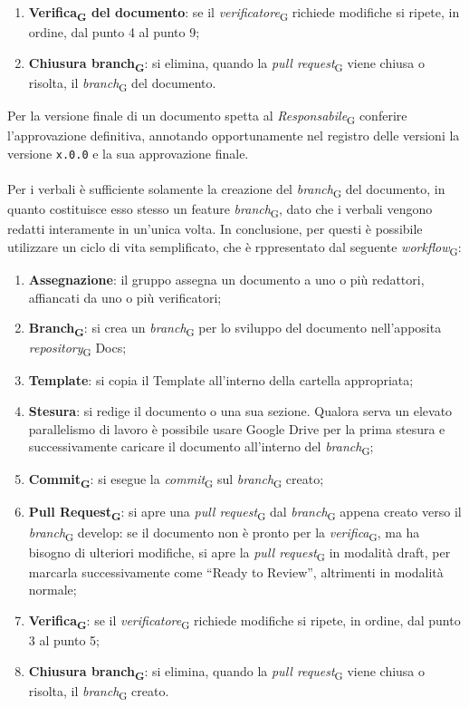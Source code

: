 \begin{enumerate}
    \item \textbf{Verifica\textsubscript{G} del documento}: se il \textit{verificatore}\textsubscript{G} richiede modifiche si ripete, in ordine, dal punto 4 al punto 9;
    \item \textbf{Chiusura branch\textsubscript{G}}: si elimina, quando la \textit{pull request}\textsubscript{G} viene chiusa o risolta, il \textit{branch}\textsubscript{G} del documento.
\end{enumerate}
Per la versione finale di un documento spetta al \textit{Responsabile}\textsubscript{G} conferire l’approvazione definitiva, annotando opportunamente nel registro delle versioni la versione \texttt{x.0.0} e la sua approvazione finale.\\ \\
Per i verbali è sufficiente solamente la creazione del \textit{branch}\textsubscript{G} del documento, in quanto costituisce esso stesso un feature \textit{branch}\textsubscript{G}, dato che i verbali vengono redatti interamente in un'unica volta. In conclusione, per questi è possibile utilizzare un ciclo di vita semplificato, che è rppresentato dal seguente \textit{workflow}\textsubscript{G}:
\begin{enumerate}
    \item \textbf{Assegnazione}: il gruppo assegna un documento a uno o più redattori, affiancati da uno o più verificatori;
    \item \textbf{Branch\textsubscript{G}}: si crea un \textit{branch}\textsubscript{G} per lo sviluppo del documento nell’apposita \textit{repository}\textsubscript{G} Docs;
    \item \textbf{Template}: si copia il Template all'interno della cartella appropriata;
    \item \textbf{Stesura}: si redige il documento o una sua sezione. Qualora serva un elevato parallelismo di lavoro è possibile usare Google Drive per la prima stesura e successivamente caricare il documento all’interno del \textit{branch}\textsubscript{G};
    \item \textbf{Commit\textsubscript{G}}: si esegue la \textit{commit}\textsubscript{G} sul \textit{branch}\textsubscript{G} creato;
    \item \textbf{Pull Request\textsubscript{G}}: si apre una \textit{pull request}\textsubscript{G} dal \textit{branch}\textsubscript{G} appena creato verso il \textit{branch}\textsubscript{G} develop: se il documento non è pronto per la \textit{verifica}\textsubscript{G}, ma ha bisogno di ulteriori modifiche, si apre la \textit{pull request}\textsubscript{G} in modalità draft, per marcarla successivamente come “Ready to Review”, altrimenti in modalità normale;
    \item \textbf{Verifica\textsubscript{G}}: se il \textit{verificatore}\textsubscript{G} richiede modifiche si ripete, in ordine, dal punto 3 al punto 5;
    \item \textbf{Chiusura branch\textsubscript{G}}: si elimina, quando la \textit{pull request}\textsubscript{G} viene chiusa o risolta, il \textit{branch}\textsubscript{G} creato.
\end{enumerate}

